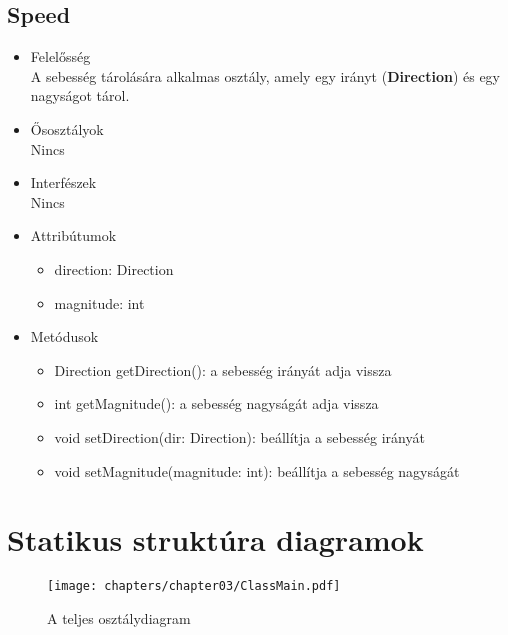 \subsection{Speed}
\begin{itemize}

\item Felelősség\\
    A sebesség tárolására alkalmas osztály, amely egy irányt (\textbf{Direction}) és egy nagyságot tárol.

\item Ősosztályok\\
Nincs

\item Interfészek\\
Nincs

\item Attribútumok\\
\begin{itemize}
    \item direction: Direction
    \item magnitude: int

\end{itemize}

\item Metódusok\\

\begin{itemize}
    \item Direction getDirection(): a sebesség irányát adja vissza
    \item int getMagnitude(): a sebesség nagyságát adja vissza
    \item void setDirection(dir: Direction): beállítja a sebesség irányát
    \item void setMagnitude(magnitude: int): beállítja a sebesség nagyságát
\end{itemize}

\end{itemize}

\clearpage

\section{Statikus struktúra diagramok}

\begin{figure}[h]
\begin{center}
\texttt{[image: chapters/chapter03/ClassMain.pdf]}
\caption{A teljes osztálydiagram}
\label{A teljes osztálydiagram}
\end{center}
\end{figure}

